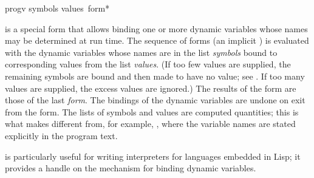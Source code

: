 \begin{defspec}
progv symbols values {\,form}*

 is a special form that allows binding one or more dynamic
variables whose names may be determined at run time.  The sequence of
forms (an implicit )
is evaluated with the dynamic variables whose names are in the list
{\it symbols} bound to corresponding values from the list {\it values}.
(If too few values are supplied, the remaining symbols are bound and then
made to have no value; see .  If too many values are
supplied, the excess values are ignored.)  The results of the 
form are those of the last
{\it form}.  The bindings of the dynamic variables are undone on
exit from the  form.  The lists of symbols and values are
computed quantities; this is what makes  different from, for
example, , where the variable names are stated explicitly in
the program text.

 is particularly useful for writing interpreters for languages
embedded in Lisp; it provides a handle on the mechanism for binding
dynamic variables.
\end{defspec}

